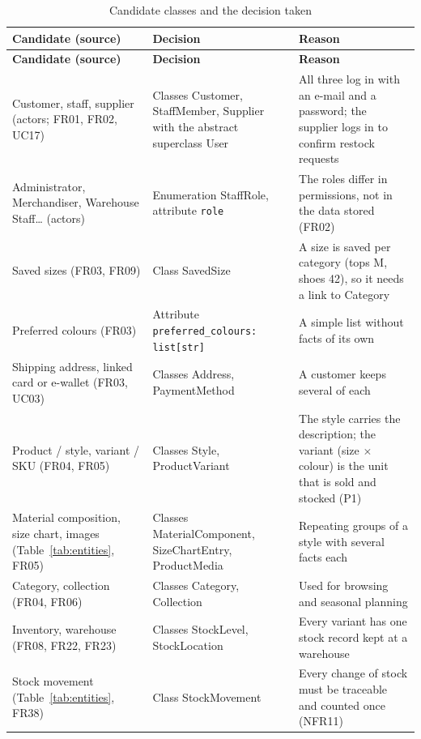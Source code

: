 {\small
\begin{xltabular}{\textwidth}{@{}L{3.6cm} L{3.4cm} Y@{}}
\caption{Candidate classes and the decision taken}\label{tab:candidates}\\
\toprule
\textbf{Candidate (source)} & \textbf{Decision} & \textbf{Reason} \\ \midrule
\endfirsthead
\toprule
\textbf{Candidate (source)} & \textbf{Decision} & \textbf{Reason} \\ \midrule
\endhead
\bottomrule
\endlastfoot
Customer, staff, supplier (actors; FR01, FR02, UC17) & Classes \textsf{Customer}, \textsf{StaffMember}, \textsf{Supplier} with the abstract superclass \textsf{User} & All three log in with an e-mail and a password; the supplier logs in to confirm restock requests \\
Administrator, Merchandiser, Warehouse Staff\ldots{} (actors) & Enumeration \textsf{StaffRole}, attribute \texttt{role} & The roles differ in permissions, not in the data stored (FR02) \\
Saved sizes (FR03, FR09) & Class \textsf{SavedSize} & A size is saved per category (tops M, shoes 42), so it needs a link to \textsf{Category} \\
Preferred colours (FR03) & Attribute \texttt{preferred\_colours: list[str]} & A simple list without facts of its own \\
Shipping address, linked card or e-wallet (FR03, UC03) & Classes \textsf{Address}, \textsf{PaymentMethod} & A customer keeps several of each \\
Product / style, variant / SKU (FR04, FR05) & Classes \textsf{Style}, \textsf{ProductVariant} & The style carries the description; the variant (size $\times$ colour) is the unit that is sold and stocked (P1) \\
Material composition, size chart, images (Table~\ref{tab:entities}, FR05) & Classes \textsf{MaterialComponent}, \textsf{SizeChartEntry}, \textsf{ProductMedia} & Repeating groups of a style with several facts each \\
Category, collection (FR04, FR06) & Classes \textsf{Category}, \textsf{Collection} & Used for browsing and seasonal planning \\
Inventory, warehouse (FR08, FR22, FR23) & Classes \textsf{StockLevel}, \textsf{StockLocation} & Every variant has one stock record kept at a warehouse \\
Stock movement (Table~\ref{tab:entities}, FR38) & Class \textsf{StockMovement} & Every change of stock must be traceable and counted once (NFR11) \\

\end{xltabular}}
